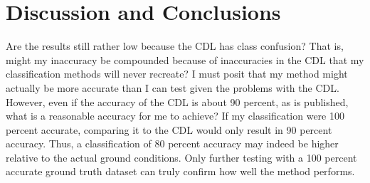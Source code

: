 
\section{Discussion and Conclusions}

Are the results still rather low because the CDL has class confusion? That is, might my inaccuracy be compounded because of inaccuracies in the CDL that my classification methods will never recreate? I must posit that my method might actually be more accurate than I can test given the problems with the CDL. However, even if the accuracy of the CDL is about 90 percent, as is published, what is a reasonable accuracy for me to achieve? If my classification were 100 percent accurate, comparing it to the CDL would only result in 90 percent accuracy. Thus, a classification of 80 percent accuracy may indeed be higher relative to the actual ground conditions. Only further testing with a 100 percent accurate ground truth dataset can truly confirm how well the method performs.